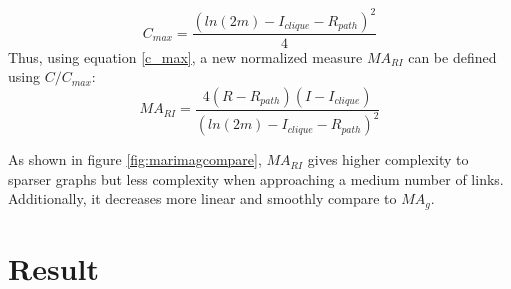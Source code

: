 \documentclass[12pt]{article}
\begin{document}
\begin{equation}
    \label{c_max}
    C_{max} = \frac{(ln(2m)-I_{clique}-R_{path})^2}{4}
\end{equation}
\noindent
Thus, using equation \ref{c_max}, a new normalized measure $MA_{RI}$ can be defined using $C/C_{max}$:\\
\begin{equation}
    MA_{RI} = \frac{4(R-R_{path})(I-I_{clique})}{(ln(2m)-I_{clique}-R_{path})^2}
\end{equation}

As shown in figure \ref{fig:marimagcompare}, $MA_{RI}$ gives higher complexity to sparser graphs but less complexity when approaching a medium number of links. Additionally, it decreases more linear and smoothly compare to $MA_g$.

\section{Result}
\end{document}
